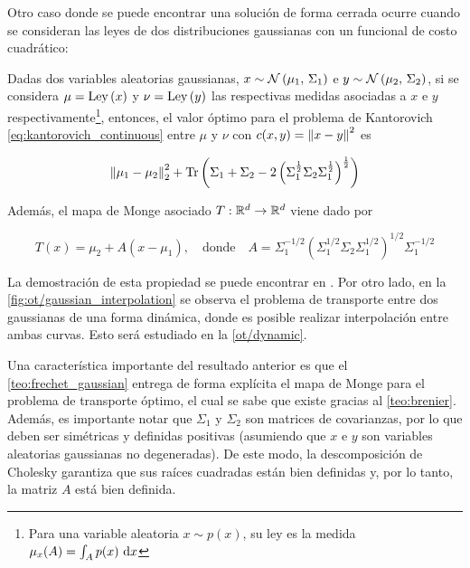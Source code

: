 Otro caso donde se puede encontrar una solución de forma cerrada ocurre cuando se consideran las leyes de dos distribuciones gaussianas con un funcional de costo cuadrático:

\begin{teo}
	\label{teo:frechet_gaussian}
	Dadas dos variables aleatorias gaussianas, $x\sim\mathcal{N}\left(\mu_1,\,\Sigma_1\right)$ e $y\sim \mathcal{N}\left(\mu_2,\,\Sigma_2\right)$, si se considera $\mu=\operatorname{Ley}\left(x\right)$ y $\nu=\operatorname{Ley}\left(y\right)$ las respectivas medidas asociadas a $x$ e $y$ respectivamente\footnote{Para una variable aleatoria $x\sim p(x)$, su ley es la medida $\mu_x(A)=\int_A p(x)\,\operatorname{d}\! x$}, entonces, el valor óptimo para el problema de Kantorovich \eqref{eq:kantorovich_continuous} entre $\mu$ y $\nu$ con $c(x,y)=\left\lVert x-y \right\rVert^2$ es

	\begin{equation*}
		\left\lVert \mu_1-\mu_2 \right\rVert_2^2 + \operatorname{Tr}\left(\Sigma_1+\Sigma_2 - 2\left(\Sigma_1^\frac{1}{2}\Sigma_2\Sigma_1^\frac{1}{2}\right)^\frac{1}{2}\right)
	\end{equation*}

	Además, el mapa de Monge asociado $T:\mathbb{R}^d\to\mathbb{R}^d$ viene dado por

	\begin{equation*}
		T(x) = \mu_2 + A(x - \mu_1),
		\quad\text{donde}\quad
		A = \Sigma_1^{-1/2}\left(\Sigma_1^{1/2} \Sigma_2 \Sigma_1^{1/2}\right)^{1/2}\Sigma_1^{-1/2}
	\end{equation*}
\end{teo}


La demostración de esta propiedad se puede encontrar en \cite{peyré2020computational}. Por otro lado, en la \autoref{fig:ot/gaussian_interpolation} se observa el problema de transporte entre dos gaussianas de una forma dinámica, donde es posible realizar interpolación entre ambas curvas. Esto será estudiado en la \autoref{ot/dynamic}. 

Una característica importante del resultado anterior es que el \autoref{teo:frechet_gaussian} entrega de forma explícita el mapa de Monge para el problema de transporte óptimo, el cual se sabe que existe gracias al \autoref{teo:brenier}. Además, es importante notar que $\Sigma_1$ y $\Sigma_2$ son matrices de covarianzas, por lo que deben ser simétricas y definidas positivas (asumiendo que $x$ e $y$ son variables aleatorias gaussianas no degeneradas). De este modo, la descomposición de Cholesky garantiza que sus raíces cuadradas están bien definidas y, por lo tanto, la matriz $A$ está bien definida.


